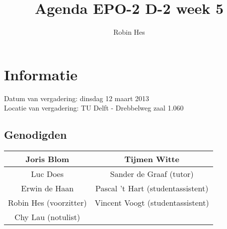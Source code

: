 \documentclass{article}
\begin{document}
\title{Agenda EPO-2 D-2 week 5}%
\author{Robin Hes}%
\maketitle

\section*{Informatie}
Datum van vergadering: dinsdag 12 maart 2013\\ %
Locatie van vergadering: TU Delft - Drebbelweg zaal 1.060 %
\subsection*{Genodigden}
\begin{center}
\begin{tabular}{|c |c |}
	\hline
	Joris Blom & Tijmen Witte \\
	\hline
	Luc Does & Sander de Graaf (tutor) \\
	\hline
	Erwin de Haan & Pascal 't Hart (studentassistent) \\
	\hline
	Robin Hes (voorzitter) & Vincent Voogt (studentassistent) \\
	\hline
	Chy Lau (notulist) &  \\
	\hline
\end{tabular}
\end{center}
\end{document}
